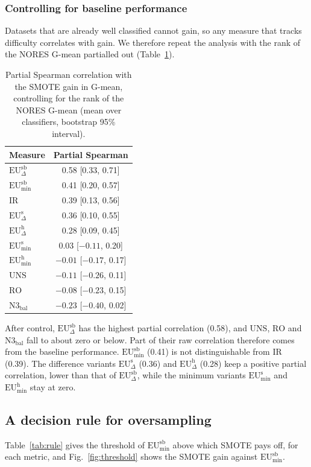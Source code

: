 \documentclass[preprint,12pt]{elsarticle}
\newcommand{\EUmin}[1]{\mathrm{EU}^{\mathrm{#1}}_{\min}}
\newcommand{\EUdif}[1]{\mathrm{EU}^{\mathrm{#1}}_{\Delta}}
\newcommand{\IR}{\mathrm{IR}}
\newcommand{\UNS}{\mathrm{UNS}}
\newcommand{\RO}{\mathrm{RO}}
\newcommand{\Nbal}{\mathrm{N3}_{\mathrm{bal}}}
\begin{document}
\subsubsection{Controlling for baseline performance}
Datasets that are already well classified cannot gain, so any measure that tracks difficulty correlates with gain. We therefore repeat the analysis with the rank of the NORES G-mean partialled out (Table~\ref{tab:partial}).

\begin{table}[H]
\centering
\caption{Partial Spearman correlation with the SMOTE gain in G-mean, controlling for the rank of the NORES G-mean (mean over classifiers, bootstrap 95\% interval).}\label{tab:partial}
\small\setlength{\tabcolsep}{4pt}
\begin{tabular}{lc}
\toprule
Measure & Partial Spearman \\
\midrule
$\EUdif{sb}$ & 0.58 [0.33, 0.71] \\
$\EUmin{sb}$ & 0.41 [0.20, 0.57] \\
$\IR$ & 0.39 [0.13, 0.56] \\
$\EUdif{s}$ & 0.36 [0.10, 0.55] \\
$\EUdif{h}$ & 0.28 [0.09, 0.45] \\
$\EUmin{s}$ & 0.03 [$-0.11$, 0.20] \\
$\EUmin{h}$ & $-0.01$ [$-0.17$, 0.17] \\
$\UNS$ & $-0.11$ [$-0.26$, 0.11] \\
$\RO$ & $-0.08$ [$-0.23$, 0.15] \\
$\Nbal$ & $-0.23$ [$-0.40$, 0.02] \\
\bottomrule
\end{tabular}
\end{table}

After control, $\EUdif{sb}$ has the highest partial correlation (0.58), and $\UNS$, $\RO$ and $\Nbal$ fall to about zero or below. Part of their raw correlation therefore comes from the baseline performance. $\EUmin{sb}$ (0.41) is not distinguishable from $\IR$ (0.39). The difference variants $\EUdif{s}$ (0.36) and $\EUdif{h}$ (0.28) keep a positive partial correlation, lower than that of $\EUdif{sb}$, while the minimum variants $\EUmin{s}$ and $\EUmin{h}$ stay at zero.


\subsection{A decision rule for oversampling}\label{sec:rule}
Table~\ref{tab:rule} gives the threshold of $\EUmin{sb}$ above which SMOTE pays off, for each metric, and Fig.~\ref{fig:threshold} shows the SMOTE gain against $\EUmin{sb}$.
\end{document}
